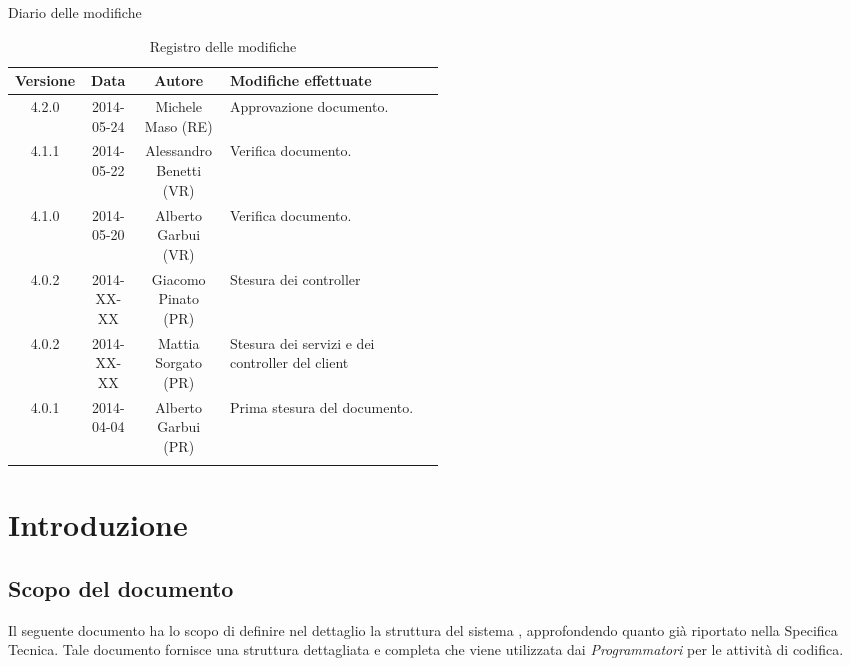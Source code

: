 
\newpage
Diario delle modifiche
\begin{center}
\begin{longtable}{|c|c|c|p{0.5\linewidth}|}
\toprule
\textbf{Versione} & \textbf{Data} & \textbf{Autore} & \textbf{Modifiche effettuate}\\

\midrule
4.2.0 & 2014-05-24 & Michele Maso (RE) & Approvazione documento.\\
\midrule
4.1.1 & 2014-05-22 & Alessandro Benetti (VR) & Verifica documento.\\
\midrule
4.1.0 & 2014-05-20 & Alberto Garbui (VR) & Verifica documento.\\
\midrule
4.0.2 & 2014-XX-XX & Giacomo Pinato (PR) & Stesura dei controller\\
\midrule
4.0.2 & 2014-XX-XX & Mattia Sorgato (PR) & Stesura dei servizi e dei controller del client\\
\midrule
4.0.1 & 2014-04-04 & Alberto Garbui (PR) & Prima stesura del documento.\\

\bottomrule
\caption{Registro delle modifiche}
\label{tab:changelog}

\end{longtable}
\end{center}

\newpage
\tableofcontents

\newpage
\listoffigures %

\newpage
\section{Introduzione}
\subsection{Scopo del documento}
Il seguente documento ha lo scopo di definire nel dettaglio la struttura del sistema , approfondendo quanto già riportato 
nella Specifica Tecnica. Tale documento fornisce una struttura dettagliata e completa che viene utilizzata dai \emph{Programmatori} per le 
attività di codifica.

